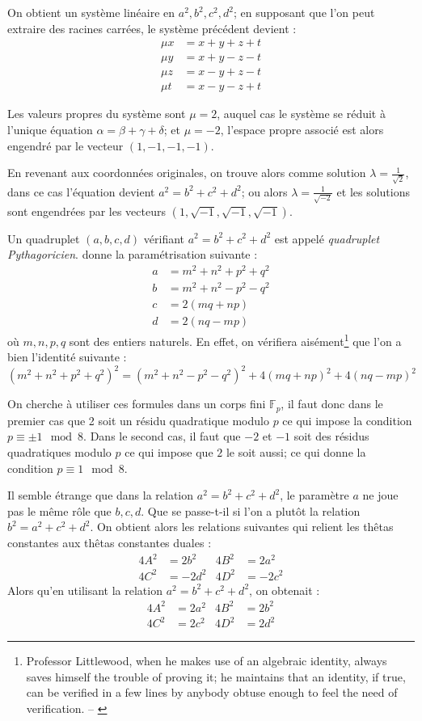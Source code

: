 \documentclass[a4paper]{article}
\theoremstyle{definition}
\theoremstyle{remark}
\numberwithin{equation}{section}
\begin{document}
On obtient un système linéaire en $a^2,b^2,c^2,d^2$; en supposant que l'on peut extraire des racines carrées, le système précédent devient :
\begin{align*}
\mu x &= x + y +  z + t \\
\mu y &= x + y -  z - t \\
\mu z &= x - y +  z - t \\
\mu t &= x - y -  z + t
\end{align*}

Les valeurs propres du système sont $\mu = 2$, auquel cas le système se réduit à l'unique équation $\alpha = \beta + \gamma + \delta$; et $\mu = -2$, l'espace propre associé est alors engendré par le vecteur $(1,-1,-1,-1)$.

En revenant aux coordonnées originales, on trouve alors comme solution $\lambda = \frac{1}{\sqrt 2}$, dans ce cas l'équation devient $a^2 = b^2 + c^2 + d^2$; ou alors $\lambda = \frac{1}{\sqrt{-2}}$ et les solutions sont engendrées par les vecteurs $(1,\sqrt{-1},\sqrt{-1},\sqrt{-1})$.

Un quadruplet $(a,b,c,d)$ vérifiant $a^2 = b^2 + c^2 + d^2$ est appelé \emph{quadruplet Pythagoricien}. \citet{mordell} donne la paramétrisation suivante :
\begin{align*}
a &= m^2 + n^2 + p^2 + q^2 \\
b &= m^2 + n^2 - p^2 - q^2 \\
c &= 2(mq+np) \\
d &= 2(nq-mp)
\end{align*}
où $m,n,p,q$ sont des entiers naturels. En effet, on vérifiera aisément\footnote{Professor Littlewood, when he makes use of an algebraic identity, always saves himself the trouble of proving it;
he maintains that an identity, if true, can be verified in a few
lines by anybody obtuse enough to feel the need of verification. -- \citet{dyson}} que l'on a bien l'identité suivante :
$$(m^2 + n^2 + p^2 + q^2)^2 = (m^2 + n^2 - p^2 - q^2)^2 + 4(mq+np)^2 + 4(nq-mp)^2$$

On cherche à utiliser ces formules dans un corps fini $\mathbb{F}_p$, il faut donc dans le premier cas que 2 soit un résidu quadratique modulo $p$ ce qui impose la condition $p \equiv \pm 1 \mod{8}$. Dans le second cas, il faut que $-2$ et $-1$ soit des résidus quadratiques modulo $p$ ce qui impose que $2$ le soit aussi; ce qui donne la condition $p \equiv 1 \mod{8}$.

Il semble étrange que dans la relation $a^2 = b^2 + c^2 + d^2$, le paramètre $a$ ne joue pas le même rôle que $b,c,d$. Que se passe-t-il si l'on a plutôt la relation $b^2 = a^2 + c^2 + d^2$. On obtient alors les relations suivantes qui relient les thêtas constantes aux thêtas constantes duales :
\begin{align*}
4A^2 &= 2b^2  &4B^2 &= 2a^2 \\
4C^2 &= -2d^2  &4D^2 &= -2c^2
\end{align*}
Alors qu'en utilisant la relation $a^2 = b^2 + c^2 + d^2$, on obtenait :
\begin{align*}
4A^2 &= 2a^2  &4B^2 &= 2b^2 \\
4C^2 &= 2c^2  &4D^2 &= 2d^2
\end{align*}
\end{document}
